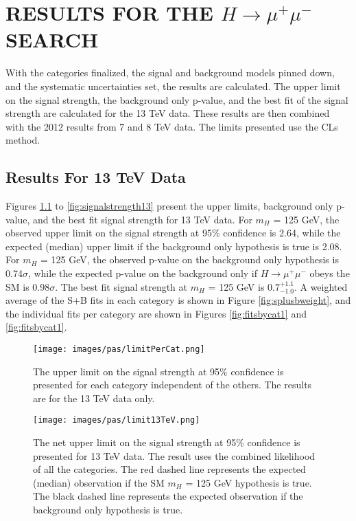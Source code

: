 \chapter{RESULTS FOR THE $H\rightarrow\mu^+\mu^-$ SEARCH} \label{results}

With the categories finalized, the signal and background models pinned down, and the systematic uncertainties set, the results are calculated. The upper limit on the signal strength, the background only p-value, and the best fit of the signal strength are calculated for the 13 TeV data. These results are then combined with the 2012 results from 7 and 8 TeV data. The limits presented use the CLs method.  
\section{Results For 13 TeV Data}
Figures \ref{fig:limitPerCat} to \ref{fig:signalstrength13} present the upper limits, background only p-value, and the best fit signal strength for 13 TeV data. For $m_H$ = 125 GeV, the observed upper limit on the signal strength at 95\% confidence is 2.64, while the expected (median) upper limit if the background only hypothesis is true is 2.08. For $m_H$ = 125 GeV, the observed p-value on the background only hypothesis is 0.74$\sigma$, while the expected p-value on the background only if $H\rightarrow\mu^+\mu^-$ obeys the SM is 0.98$\sigma$. The best fit signal strength at $m_H$ = 125 GeV is $0.7^{+1.1}_{-1.0}$. A weighted average of the S+B fits in each category is shown in Figure \ref{fig:splusbweight}, and the individual fits per category are shown in Figures \ref{fig:fitsbycat1} and \ref{fig:fitsbycat1}. 
\begin{figure}[h!]
    \centering
    \texttt{[image: images/pas/limitPerCat.png]}
    \caption[The upper limit on the signal strength for the individual categories on 13 TeV data alone.]
    {The upper limit on the signal strength at 95\% confidence is presented for each category independent of the others. The results are for the 13 TeV data only.}
    \label{fig:limitPerCat}
\end{figure}
\begin{figure}[h!]
    \centering
    \texttt{[image: images/pas/limit13TeV.png]}
    \caption[The net upper limit on the signal strength for 13 TeV data alone.]
    {The net upper limit on the signal strength at 95\% confidence is presented for 13 TeV data. The result uses the combined likelihood of all the categories. The red dashed line represents the expected (median) observation if the SM $m_H$ = 125 GeV hypothesis is true. The black dashed line represents the expected observation if the background only hypothesis is true.}
    \label{fig:limit13}
\end{figure}
